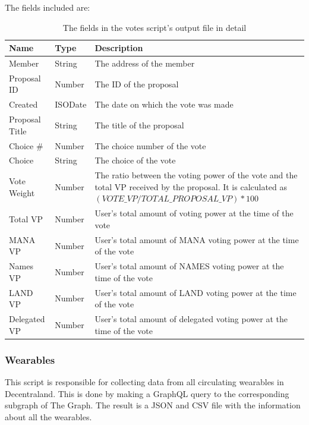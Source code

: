 \documentclass[MSE,Master,english]{twbook}%
\begin{document}
The fields included are:
\begin{table}[H]
  \centering
  \begin{tabularx}{\textwidth}{|l|l|X|}
  \hline
  \textbf{Name} & \textbf{Type} & \textbf{Description}                                            \\ \hline
  Member         & String  & The address of the member                                             \\ \hline
  Proposal ID    & Number  & The ID of the proposal                                                \\ \hline
  Created        & ISODate & The date on which the vote was made                                   \\ \hline
  Proposal Title & String  & The title of the proposal                                             \\ \hline
  Choice \#      & Number  & The choice number of the vote                                         \\ \hline
  Choice         & String  & The choice of the vote                                                \\ \hline
  Vote Weight &
    Number &
    The ratio between the voting power of the vote and the total VP received by the proposal. It is calculated as $(VOTE\_VP / TOTAL\_PROPOSAL\_VP) * 100$ \\ \hline
  Total VP       & Number  & User's total amount of voting power at the time of the vote           \\ \hline
  MANA VP        & Number  & User's total amount of MANA voting power at the time of the vote      \\ \hline
  Names VP       & Number  & User's total amount of NAMES voting power at the time of the vote     \\ \hline
  LAND VP        & Number  & User's total amount of LAND voting power at the time of the vote      \\ \hline
  Delegated VP   & Number  & User's total amount of delegated voting power at the time of the vote \\ \hline
  \end{tabularx}
  \caption{The fields in the votes script's output file in detail}
  \label{table:votes}
\end{table}

\subsubsection{Wearables}
This script is responsible for collecting data from all circulating wearables in Decentraland. This is done by making a GraphQL query to the corresponding subgraph of The Graph. The result is a JSON and CSV file with the information about all the wearables. \\
\end{document}
